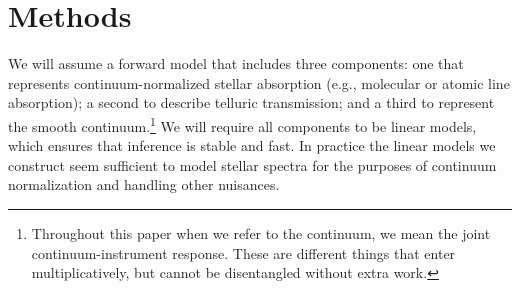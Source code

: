 \documentclass[modern]{aastex631}
\begin{document}


\section{Methods}\label{sec:methods}

We will assume a forward model that includes three components: one that represents continuum-normalized stellar absorption (e.g., molecular or atomic line absorption); a second to describe telluric transmission; and a third to represent the smooth continuum.\footnote{Throughout this paper when we refer to the continuum, we mean the joint continuum-instrument response. These are different things that enter multiplicatively, but cannot be disentangled without extra work.} We will require all components to be linear models, which ensures that inference is stable and fast. In practice the linear models we construct seem sufficient to model stellar spectra for the purposes of continuum normalization and handling other nuisances.\\

\end{document}
